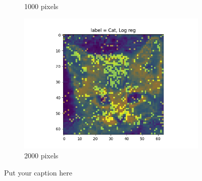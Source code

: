 \documentclass{article}
\begin{document}
\begin{figure}[H]
\begin{subfigure}{.33\textwidth}
  \caption{1000 pixels}
  \label{fig:sub-second}
\end{subfigure}
\begin{subfigure}{.33\textwidth}
  \centering
  \includegraphics[width=1\linewidth]{2d/,2000, Log reg.png}  
  \caption{2000 pixels}
  \label{fig:sub-second}
\end{subfigure}
\caption{Put your caption here}
\label{feet select 2d}
\end{figure}
\end{document}

